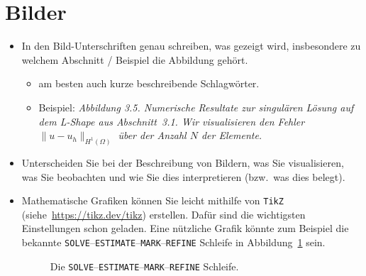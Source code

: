 \documentclass[../template_diplom.tex]{subfiles}
\begin{document}
\section{Bilder}

\begin{itemize}
  \item In den Bild-Unterschriften genau schreiben, was gezeigt wird, insbesondere zu welchem Abschnitt / Beispiel die Abbildung gehört.
        \begin{itemize}
          \item am besten auch kurze beschreibende Schlagwörter.
          \item Beispiel: \emph{Abbildung 3.5. Numerische Resultate zur singulären Lösung auf dem L-Shape aus  Abschnitt~3.1. Wir visualisieren den Fehler $\|u-u_h\|_{H^1(\Omega)}$ über der Anzahl $N$ der Elemente.}
        \end{itemize}

  \item Unterscheiden Sie bei der Beschreibung von Bildern, was Sie visualisieren, was Sie beobachten und wie Sie dies interpretieren (bzw.\ was dies belegt).

  \item Mathematische Grafiken können Sie leicht mithilfe von \verb$TikZ$ (siehe~\url{https://tikz.dev/tikz}) erstellen. Dafür sind die wichtigsten Einstellungen schon geladen. Eine nützliche Grafik könnte zum Beispiel die bekannte \texttt{SOLVE}--\texttt{ESTIMATE}--\texttt{MARK}--\texttt{REFINE} Schleife in Abbildung~\ref{fig:afem} sein.
        \begin{figure}
          \centering
          \caption{Die \texttt{SOLVE}--\texttt{ESTIMATE}--\texttt{MARK}--\texttt{REFINE} Schleife.\label{fig:afem}}
        \end{figure}


\end{itemize}
\end{document}
